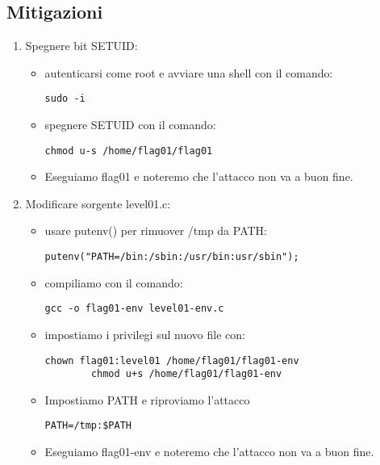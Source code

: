 \subsection{Mitigazioni}
\begin{enumerate}
    \item Spegnere bit SETUID:
    \begin{itemize}
        \item autenticarsi come root e avviare una shell con il comando: \begin{lstlisting}[style=bashstyle] 
        sudo -i
        \end{lstlisting}
        \item spegnere SETUID con il comando: \begin{lstlisting}[style=bashstyle] 
        chmod u-s /home/flag01/flag01
        \end{lstlisting}   
        \item Eseguiamo flag01 e noteremo che l’attacco non va a buon fine. 
    \end{itemize}
    \item Modificare sorgente level01.c:
    \begin{itemize}
        \item usare putenv() per rimuover /tmp da PATH:
        \begin{lstlisting}[style=cstyle]
        putenv("PATH=/bin:/sbin:/usr/bin:usr/sbin");
        \end{lstlisting}
        \item compiliamo con il comando:
        \begin{lstlisting}[style=bashstyle]
        gcc -o flag01-env level01-env.c
        \end{lstlisting}
        \item impostiamo i privilegi sul nuovo file con:
        \begin{lstlisting}[style=bashstyle]
        chown flag01:level01 /home/flag01/flag01-env 
        chmod u+s /home/flag01/flag01-env   
        \end{lstlisting}
        \item Impostiamo PATH e riproviamo l'attacco
        \begin{lstlisting}[style=bashstyle]
        PATH=/tmp:$PATH  
        \end{lstlisting} 
        \item Eseguiamo flag01-env e noteremo che l’attacco non va a buon fine.
    \end{itemize}   
\end{enumerate}


